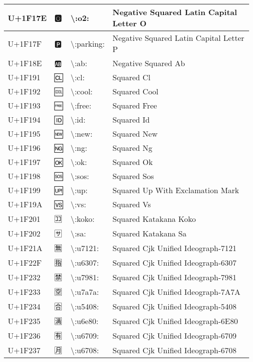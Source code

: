 \begin{table}[h]
\begin{tabulary}{\linewidth}{|L|L|L|L|}
\hline
U+1F17E & 🅾 & {\textbackslash}:o2: & Negative Squared Latin Capital Letter O \\
\hline
U+1F17F & 🅿 & {\textbackslash}:parking: & Negative Squared Latin Capital Letter P \\
\hline
U+1F18E & 🆎 & {\textbackslash}:ab: & Negative Squared Ab \\
\hline
U+1F191 & 🆑 & {\textbackslash}:cl: & Squared Cl \\
\hline
U+1F192 & 🆒 & {\textbackslash}:cool: & Squared Cool \\
\hline
U+1F193 & 🆓 & {\textbackslash}:free: & Squared Free \\
\hline
U+1F194 & 🆔 & {\textbackslash}:id: & Squared Id \\
\hline
U+1F195 & 🆕 & {\textbackslash}:new: & Squared New \\
\hline
U+1F196 & 🆖 & {\textbackslash}:ng: & Squared Ng \\
\hline
U+1F197 & 🆗 & {\textbackslash}:ok: & Squared Ok \\
\hline
U+1F198 & 🆘 & {\textbackslash}:sos: & Squared Sos \\
\hline
U+1F199 & 🆙 & {\textbackslash}:up: & Squared Up With Exclamation Mark \\
\hline
U+1F19A & 🆚 & {\textbackslash}:vs: & Squared Vs \\
\hline
U+1F201 & 🈁 & {\textbackslash}:koko: & Squared Katakana Koko \\
\hline
U+1F202 & 🈂 & {\textbackslash}:sa: & Squared Katakana Sa \\
\hline
U+1F21A & 🈚 & {\textbackslash}:u7121: & Squared Cjk Unified Ideograph-7121 \\
\hline
U+1F22F & 🈯 & {\textbackslash}:u6307: & Squared Cjk Unified Ideograph-6307 \\
\hline
U+1F232 & 🈲 & {\textbackslash}:u7981: & Squared Cjk Unified Ideograph-7981 \\
\hline
U+1F233 & 🈳 & {\textbackslash}:u7a7a: & Squared Cjk Unified Ideograph-7A7A \\
\hline
U+1F234 & 🈴 & {\textbackslash}:u5408: & Squared Cjk Unified Ideograph-5408 \\
\hline
U+1F235 & 🈵 & {\textbackslash}:u6e80: & Squared Cjk Unified Ideograph-6E80 \\
\hline
U+1F236 & 🈶 & {\textbackslash}:u6709: & Squared Cjk Unified Ideograph-6709 \\
\hline
U+1F237 & 🈷 & {\textbackslash}:u6708: & Squared Cjk Unified Ideograph-6708 \\
\hline

\end{tabulary}
\end{table}
